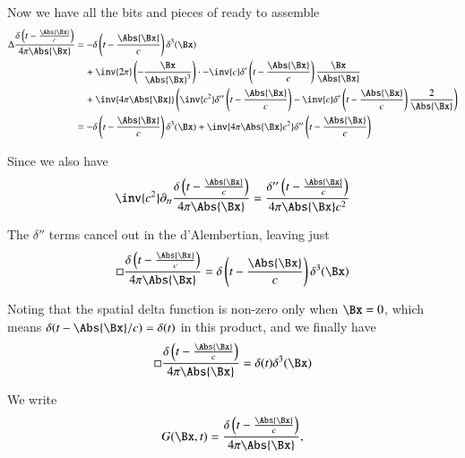 Now we have all the bits and pieces of  ready to assemble
%
\begin{equation}\label{eqn:relativisticElectrodynamicsL18:920}
\begin{aligned}
\Delta \frac{\delta\left(t - \frac{\Abs{\Bx}}{c}\right)}{4 \pi \Abs{\Bx} }
&=
-\delta\left(t - \frac{\Abs{\Bx}}{c}\right) \delta^3(\Bx) \\
&\quad +\inv{2\pi} \left( - \frac{\Bx}{\Abs{\Bx}^3} \right)
\cdot
-\inv{c} \delta'\left(t - \frac{\Abs{\Bx}}{c}\right) \frac{\Bx}{\Abs{\Bx}} \\
&\quad +
\inv{4 \pi \Abs{\Bx} }
\left(
\inv{c^2} \delta''\left(t - \frac{\Abs{\Bx}}{c}\right) -\inv{c} \delta'\left(t - \frac{\Abs{\Bx}}{c}\right) \frac{2}{\Abs{\Bx}} \right) \\
&=
-\delta\left(t - \frac{\Abs{\Bx}}{c}\right) \delta^3(\Bx)
+\inv{4 \pi \Abs{\Bx} c^2 }
\delta''\left(t - \frac{\Abs{\Bx}}{c}\right)
\end{aligned}
\end{equation}

Since we also have
%
\begin{equation}\label{eqn:relativisticElectrodynamicsL18:500}
\inv{c^2} \partial_{tt}
\frac{\delta\left(t - \frac{\Abs{\Bx}}{c}\right)}{4 \pi \Abs{\Bx} }
=
\frac{\delta''\left(t - \frac{\Abs{\Bx}}{c}\right)}{4 \pi \Abs{\Bx} c^2}
\end{equation}

The \(\delta''\) terms cancel out in the d'Alembertian, leaving just
%
\begin{equation}\label{eqn:relativisticElectrodynamicsL18:460}
\square \frac{\delta\left(t - \frac{\Abs{\Bx}}{c}\right)}{4 \pi \Abs{\Bx} }
=
\delta\left(t - \frac{\Abs{\Bx}}{c}\right) \delta^3(\Bx)
\end{equation}

Noting that the spatial delta function is non-zero only when \(\Bx = 0\), which means \(\delta(t - \Abs{\Bx}/c) = \delta(t)\) in this product, and we finally have
%
\begin{equation}\label{eqn:relativisticElectrodynamicsL18:480}
\square \frac{\delta\left(t - \frac{\Abs{\Bx}}{c}\right)}{4 \pi \Abs{\Bx} }
=
\delta(t) \delta^3(\Bx)
\end{equation}

We write
%
\begin{equation}\label{eqn:relativisticElectrodynamicsL18:520}
G(\Bx, t) = \frac{\delta\left(t - \frac{\Abs{\Bx}}{c}\right)}{4 \pi \Abs{\Bx} },
\end{equation}
